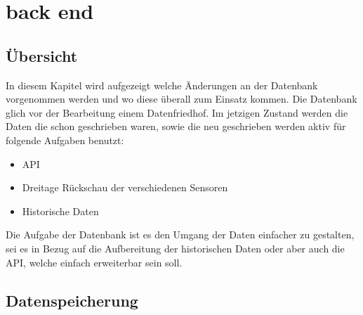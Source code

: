 \section{back end}


\subsection{Übersicht}
In diesem Kapitel wird aufgezeigt welche Änderungen an der Datenbank vorgenommen werden und wo diese überall zum Einsatz kommen. Die Datenbank glich vor der Bearbeitung einem Datenfriedhof. Im jetzigen Zustand werden die Daten die schon geschrieben waren, sowie die neu geschrieben werden aktiv für folgende Aufgaben benutzt:\\
\begin{itemize}
\item API
\item Dreitage Rückschau der verschiedenen Sensoren
\item Historische Daten
\end{itemize}

Die Aufgabe der Datenbank ist es den Umgang der Daten einfacher zu gestalten, sei es in Bezug auf die Aufbereitung der historischen Daten oder aber auch die API, welche einfach erweiterbar sein soll. 


\subsection{Datenspeicherung}
